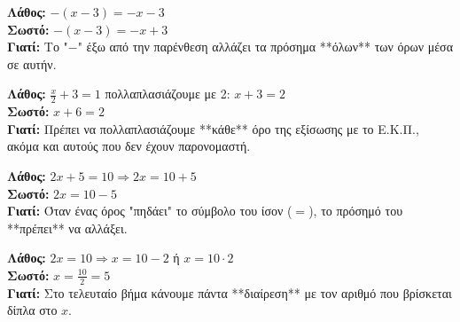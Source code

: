 \documentclass[11pt,a4paper,modern]{FFExercises}
\begin{document}

\begin{tcolorbox}[colback=red!5!white,colframe=red!75!black,title=1. Πρόσημα και Παρένθεση]
    \textbf{Λάθος:} $-(x - 3) = -x - 3$ \\
    \textbf{Σωστό:} $-(x - 3) = -x + 3$ \\
    \textbf{Γιατί:} Το "$-$" έξω από την παρένθεση αλλάζει τα πρόσημα **όλων** των όρων μέσα σε αυτήν.
\end{tcolorbox}

\begin{tcolorbox}[colback=red!5!white,colframe=red!75!black,title=2. Απαλοιφή Παρονομαστών στο "Σκέτο" Νούμερο]
    \textbf{Λάθος:} $\frac{x}{2} + 3 = 1$ πολλαπλασιάζουμε με 2: $x + 3 = 2$ \\
    \textbf{Σωστό:} $x + 6 = 2$ \\
    \textbf{Γιατί:} Πρέπει να πολλαπλασιάζουμε **κάθε** όρο της εξίσωσης με το Ε.Κ.Π., ακόμα και αυτούς που δεν έχουν παρονομαστή.
\end{tcolorbox}

\begin{tcolorbox}[colback=red!5!white,colframe=red!75!black,title=3. Μεταφορά Όρων]
    \textbf{Λάθος:} $2x + 5 = 10 \Rightarrow 2x = 10 + 5$ \\
    \textbf{Σωστό:} $2x = 10 - 5$ \\
    \textbf{Γιατί:} Όταν ένας όρος "πηδάει" το σύμβολο του ίσον ($=$), το πρόσημό του **πρέπει** να αλλάξει.
\end{tcolorbox}

\begin{tcolorbox}[colback=red!5!white,colframe=red!75!black,title=4. Διαίρεση με τον Συντελεστή]
    \textbf{Λάθος:} $2x = 10 \Rightarrow x = 10 - 2$ ή $x = 10 \cdot 2$ \\
    \textbf{Σωστό:} $x = \frac{10}{2} = 5$ \\
    \textbf{Γιατί:} Στο τελευταίο βήμα κάνουμε πάντα **διαίρεση** με τον αριθμό που βρίσκεται δίπλα στο $x$.
\end{tcolorbox}
\end{document}
